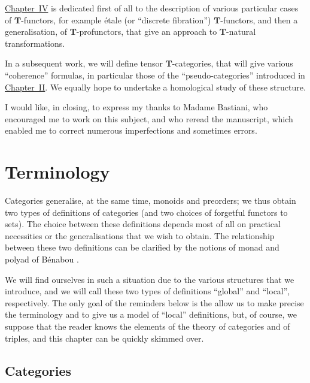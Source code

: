 \documentclass[fleqn]{article}
\newcommand{\oldpage}[1]{\marginpar{\footnotesize$\Big\vert$ \textit{p.~#1}}}
\newcommand{\TT}{\mathbf{T}}
\begin{document}
\hyperref[sec:IV]{Chapter~IV} is dedicated first of all to the description of various particular cases of $\TT$-functors, for example étale (or ``discrete fibration'') $\TT$-functors, and then a generalisation, of $\TT$-profunctors, that give an approach to $\TT$-natural transformations.

In a subsequent work, we will define tensor $\TT$-categories, that will give various ``coherence'' formulas, in particular those of the ``pseudo-categories'' introduced in \hyperref[sec:II]{Chapter~II}.
We equally hope to undertake a homological study of these structure.

I would like, in closing, to express my thanks to Madame Bastiani, who encouraged me to work on this subject, and who reread the manuscript, which enabled me to correct numerous imperfections and sometimes errors.





\clearpage
\tableofcontents


\clearpage
\setcounter{section}{-1}
\section{Terminology}
\label{sec:0}

\oldpage{219}

Categories generalise, at the same time, monoids and preorders;
we thus obtain two types of definitions of categories (and two choices of forgetful functors to sets).
The choice between these definitions depends most of all on practical necessities or the generalisations that we wish to obtain.
The relationship between these two definitions can be clarified by the notions of monad and polyad of Bénabou \cite{Be}.

We will find ourselves in such a situation due to the various structures that we introduce, and we will call these two types of definitions ``global'' and ``local'', respectively.
The only goal of the reminders below is the allow us to make precise the terminology and to give us a model of ``local'' definitions, but, of course, we suppose that the reader knows the elements of the theory of categories and of triples, and this chapter can be quickly skimmed over.


\subsection{Categories}
\label{sec:0.1}
\end{document}
